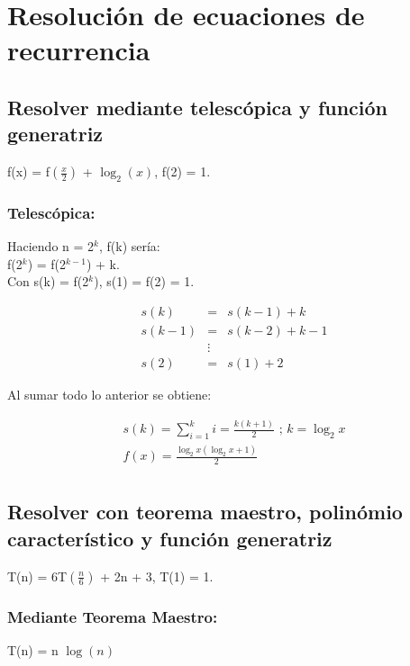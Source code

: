 \section{Resolución de ecuaciones de recurrencia}

\subsection{Resolver mediante telescópica y función generatriz}
	\begin{center}
		f(x) = f$\left(\frac{x}{2}\right)$ + $\log_{2}(x)$, f(2) = 1.
	\end{center}
	\subsubsection{Telescópica:}
		\begin{center}	
			Haciendo n = 2$^{k}$, f(k) sería:\\
			f(2$^k$) = f(2$^{k-1}$) + k.\\
			Con s(k) = f(2$^{k}$), s(1) = f(2) = 1.
		\end{center}
		\begin{eqnarray*}
			s(k) &=& s(k-1) + k\\
			s(k-1) &=& s(k-2) + k-1\\
			&\vdots & \\
			s(2) &=& s(1) +2
		\end{eqnarray*}		
		\begin{center}
			Al sumar todo lo anterior se obtiene:\\
		\end{center}					
		\begin{eqnarray*}
			s(k) = \sum_{i=1}^{k} i = \frac{k(k+1)}{2} \text{ ; } k = \log_2 x\\
			f(x) = \frac{\log_2 x (\log_2 x + 1)}{2} \\
		\end{eqnarray*}

\subsection{Resolver con teorema maestro, polinómio característico y función generatriz}
	\begin{center}
		T(n) = 6T$\left(\frac{n}{6}\right)$ + 2n + 3, T(1) = 1.
	\end{center}
	\subsubsection{Mediante Teorema Maestro:}
		\begin{center}
			T(n) = n $\log{}(n)$
		\end{center}
